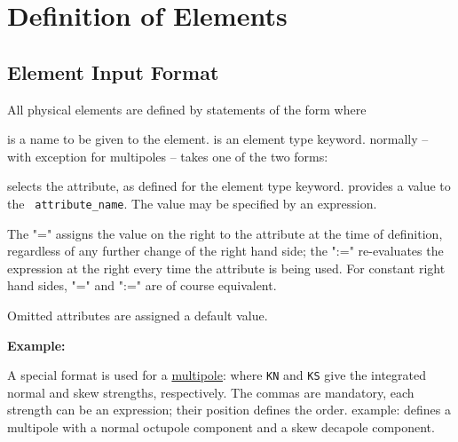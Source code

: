 
\chapter{Definition of Elements}
\label{chap:element_definition}

\section{Element Input Format}
\label{sec:element_input}

All physical elements are defined by statements of the form 
where 
\begin{madlist}
   is a name to be given to the element.
   is an element type keyword.  
   normally -- with exception for multipoles -- takes one of the two forms:
    \begin{madlist}
       selects the attribute,
      as defined for the element type keyword.   
       provides a value to the {\tt
        attribute\_name}. The value may be specified by an expression.
    \end{madlist}
    The "=" assigns the value on the right to
    the attribute at the time of definition, regardless of any
    further change of the right hand side; the ":=" re-evaluates
    the expression at the right every time the attribute is being
    used. For constant right hand sides, "=" and ":=" are of
    course equivalent.  
\end{madlist}

Omitted attributes are assigned a default value.

{\bf Example:} 

A special format is used for a \hyperref[sec:multipole]{multipole}: 
where {\tt KN} and {\tt KS} give the integrated normal and skew strengths,
respectively. The commas are mandatory, each strength can be an
expression; their position defines the order. example:  
defines a multipole with a normal octupole component and a skew decapole
component.  

